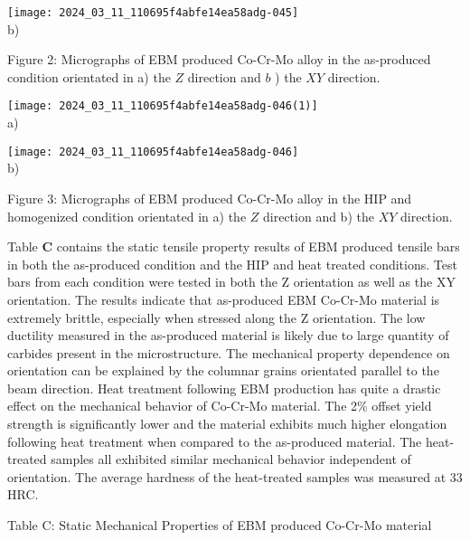 \documentclass[10pt]{article}
\begin{document}
\texttt{[image: 2024\_03\_11\_110695f4abfe14ea58adg-045]}\\
b)

Figure 2: Micrographs of EBM produced Co-Cr-Mo alloy in the as-produced condition orientated in a) the $Z$ direction and $b$ ) the $X Y$ direction.

\texttt{[image: 2024\_03\_11\_110695f4abfe14ea58adg-046(1)]}\\
a)

\texttt{[image: 2024\_03\_11\_110695f4abfe14ea58adg-046]}\\
b)

Figure 3: Micrographs of EBM produced Co-Cr-Mo alloy in the HIP and homogenized condition orientated in a) the $Z$ direction and b) the $X Y$ direction.

Table $\mathbf{C}$ contains the static tensile property results of EBM produced tensile bars in both the as-produced condition and the HIP and heat treated conditions. Test bars from each condition were tested in both the $\mathrm{Z}$ orientation as well as the $\mathrm{XY}$ orientation. The results indicate that as-produced EBM Co-Cr-Mo material is extremely brittle, especially when stressed along the $\mathrm{Z}$ orientation. The low ductility measured in the as-produced material is likely due to large quantity of carbides present in the microstructure. The mechanical property dependence on orientation can be explained by the columnar grains orientated parallel to the beam direction. Heat treatment following EBM production has quite a drastic effect on the mechanical behavior of Co-Cr-Mo material. The 2\% offset yield strength is significantly lower and the material exhibits much higher elongation following heat treatment when compared to the as-produced material. The heat-treated samples all exhibited similar mechanical behavior independent of orientation. The average hardness of the heat-treated samples was measured at 33 HRC.

Table C: Static Mechanical Properties of EBM produced Co-Cr-Mo material
\end{document}
